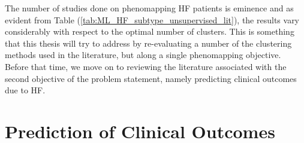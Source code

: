 \documentclass[../thesis.tex]{subfiles}
\begin{document}
\indent The number of studies done on phenomapping HF patients is eminence and as evident from Table (\ref{tab:ML_HF_subtype_unsupervised_lit}), the results vary considerably with respect to the optimal number of clusters. This is something that this thesis will try to address by re-evaluating a number of the clustering methods used in the literature, but along a single phenomapping objective. Before that time, we move on to reviewing the literature associated with the second objective of the problem statement, namely predicting clinical outcomes due to HF.

\section{Prediction of Clinical Outcomes}
\label{sec:predclincout}
\end{document}
